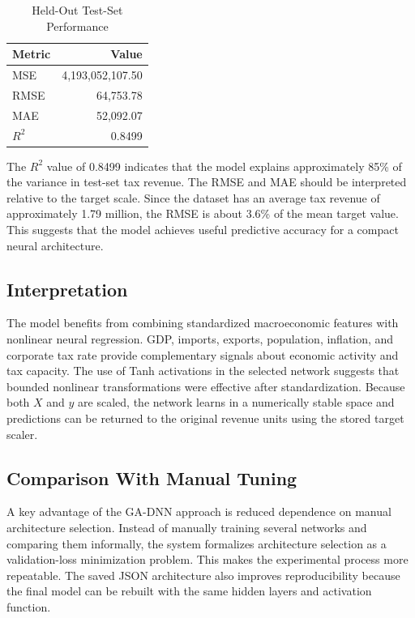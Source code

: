 \documentclass[conference]{IEEEtran}
\begin{document}
\begin{table}[htbp]
\caption{Held-Out Test-Set Performance}
\centering
\begin{tabular}{lr}
\toprule
\textbf{Metric} & \textbf{Value} \\
\midrule
MSE & 4,193,052,107.50 \\
RMSE & 64,753.78 \\
MAE & 52,092.07 \\
$R^{2}$ & 0.8499 \\
\bottomrule
\end{tabular}
\label{tab:results}
\end{table}

The $R^{2}$ value of 0.8499 indicates that the model explains approximately 85\% of the variance in test-set tax revenue. The RMSE and MAE should be interpreted relative to the target scale. Since the dataset has an average tax revenue of approximately 1.79 million, the RMSE is about 3.6\% of the mean target value. This suggests that the model achieves useful predictive accuracy for a compact neural architecture.

\subsection{Interpretation}
The model benefits from combining standardized macroeconomic features with nonlinear neural regression. GDP, imports, exports, population, inflation, and corporate tax rate provide complementary signals about economic activity and tax capacity. The use of Tanh activations in the selected network suggests that bounded nonlinear transformations were effective after standardization. Because both $X$ and $y$ are scaled, the network learns in a numerically stable space and predictions can be returned to the original revenue units using the stored target scaler.

\subsection{Comparison With Manual Tuning}
A key advantage of the GA-DNN approach is reduced dependence on manual architecture selection. Instead of manually training several networks and comparing them informally, the system formalizes architecture selection as a validation-loss minimization problem. This makes the experimental process more repeatable. The saved JSON architecture also improves reproducibility because the final model can be rebuilt with the same hidden layers and activation function.
\end{document}
